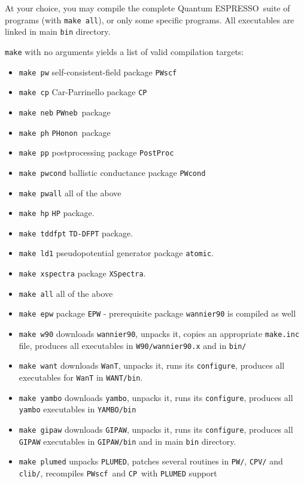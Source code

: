 \documentclass[12pt,a4paper]{article}
\def\qe{{\sc Quantum ESPRESSO}}
\def\configure{\texttt{configure}}
\def\PWscf{\texttt{PWscf}}
\def\PHonon{\texttt{PHonon}}
\def\CP{\texttt{CP}}
\def\PostProc{\texttt{PostProc}}
\def\NEB{\texttt{PWneb}}
\begin{document}
At your choice, you may compile the complete \qe\ suite of programs
(with \texttt{make all}), or only some specific programs.
All executables are linked in main \texttt{bin} directory.

\texttt{make} with no arguments yields a list of valid compilation targets:
\begin{itemize}
\item \texttt{make pw}  self-consistent-field package \PWscf
\item \texttt{make cp}  Car-Parrinello package \CP
\item \texttt{make neb} \NEB\ package
\item \texttt{make ph}  \PHonon\ package
\item \texttt{make pp}  postprocessing package \PostProc
\item \texttt{make pwcond} ballistic conductance package 
	                \texttt{PWcond}
\item \texttt{make pwall} all of the above
\item \texttt{make hp}    \texttt{HP} package. 
\item \texttt{make tddfpt} \texttt{TD-DFPT} package. 
\item \texttt{make ld1}  pseudopotential generator package 
	                 \texttt{atomic}.
\item \texttt{make xspectra} package \texttt{XSpectra}.
\item \texttt{make all} all of the above
\item \texttt{make epw} package \texttt{EPW} - prerequisite
	package \texttt{wannier90} is compiled as well
\item \texttt{make w90} downloads \texttt{wannier90}, unpacks it, copies an appropriate
                       \texttt{make.inc} file,  produces all executables
                       in \texttt{W90/wannier90.x} and in \texttt{bin/}
\item \texttt{make want} downloads \texttt{WanT}, unpacks it, runs its 
	                 \configure,
                         produces all executables for \texttt{WanT} in
                         \texttt{WANT/bin}.
\item \texttt{make yambo} downloads \texttt{yambo},
			  unpacks it, runs its \configure,
                          produces all \texttt{yambo} executables in
                          \texttt{YAMBO/bin}
\item \texttt{make gipaw} downloads \texttt{GIPAW},
                          unpacks it, runs its \configure,
                          produces all \texttt{GIPAW} executables in
                          \texttt{GIPAW/bin} and in main \texttt{bin} directory.
\item \texttt{make plumed} unpacks \texttt{PLUMED}, patches several routines
                           in \texttt{PW/}, \texttt{CPV/} and \texttt{clib/},
                           recompiles \PWscf\ and \CP\ with \texttt{PLUMED}
                           support
\end{itemize}
\end{document}
